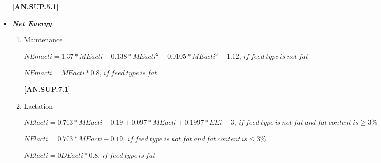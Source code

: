 \documentclass{article}
\begin{document}
\begin{refsection}
\begin{itemize}
            {\raggedleft \textbf{[AN.SUP.5.1]}\par}
            \vspace{0.5cm}

        \item \textbf{\textit{Net Energy}} 
    \vspace{0.25cm}

    \begin{enumerate}
        \item Maintenance
        \vspace{0.25cm}

        \begin{center}
        \(NEmacti = 1.37 * MEacti - 0.138 * MEacti^{2} + 0.0105 * MEacti^{3} - 1.12,\ if\ feed\ type\ is\ not\ fat\)
        \end{center}
        \vspace{0.5cm}

        \begin{center}
        \(NEmacti = MEacti * 0.8,\ if\ feed\ type\ is\ fat\)
        \end{center}
        \vspace{0.5cm}
    
            {\raggedleft \textbf{[AN.SUP.7.1]}\par}
            \vspace{0.5cm}

        \item Lactation
        \vspace{0.25cm}

        \begin{center}
        \(NElacti = 0.703 * MEacti - 0.19 + 0.097 * MEacti + 0.1997 * EEi - 3,\ if\ feed\ type\ is\ not\ fat\ and\ fat\ content\ is \geq 3\%\)
        \end{center}
        \vspace{0.5cm}

        \begin{center}
        \(NElacti = 0.703 * MEacti - 0.19,\ if\ feed\ type\ is\ not\ fat\ and\ fat\ content\ is \leq 3\%\)
        \end{center}
        \vspace{0.5cm}

        \begin{center}
        \(NElacti = 0DEacti * 0.8,\ if\ feed\ type\ is\ fat\)
        \end{center}
        \vspace{0.5cm}
    

\end{enumerate}
\end{itemize}
\end{refsection}
\end{document}
